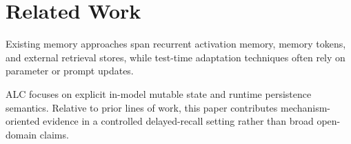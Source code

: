 \section{Related Work}
Existing memory approaches span recurrent activation memory, memory tokens, and external retrieval stores, while test-time adaptation techniques often rely on parameter or prompt updates.

ALC focuses on explicit in-model mutable state and runtime persistence semantics. Relative to prior lines of work, this paper contributes mechanism-oriented evidence in a controlled delayed-recall setting rather than broad open-domain claims.
